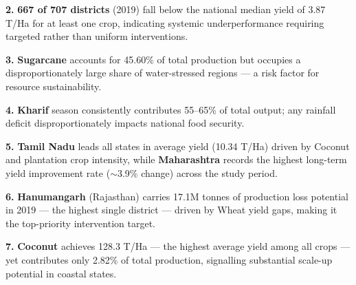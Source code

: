 \documentclass[10pt]{article}
\begin{document}
\vspace{3pt}

\begin{insightbox}
  \textbf{2.} \textbf{667 of 707 districts} (2019) fall below the national median yield
  of 3.87 T/Ha for at least one crop, indicating systemic underperformance requiring
  targeted rather than uniform interventions.
\end{insightbox}

\vspace{3pt}

\begin{insightbox}
  \textbf{3.} \textbf{Sugarcane} accounts for 45.60\% of total production but
  occupies a disproportionately large share of water-stressed regions — a risk
  factor for resource sustainability.
\end{insightbox}

\vspace{3pt}

\begin{insightbox}
  \textbf{4.} \textbf{Kharif} season consistently contributes 55–65\% of total
  output; any rainfall deficit disproportionately impacts national food security.
\end{insightbox}

\vspace{3pt}

\begin{insightbox}
  \textbf{5.} \textbf{Tamil Nadu} leads all states in average yield (10.34 T/Ha)
  driven by Coconut and plantation crop intensity, while \textbf{Maharashtra}
  records the highest long-term yield improvement rate ($\sim$3.9\% change)
  across the study period.
\end{insightbox}

\vspace{3pt}

\begin{insightbox}
  \textbf{6.} \textbf{Hanumangarh} (Rajasthan) carries 17.1M tonnes of production
  loss potential in 2019 — the highest single district — driven by Wheat yield
  gaps, making it the top-priority intervention target.
\end{insightbox}

\vspace{3pt}

\begin{insightbox}
  \textbf{7.} \textbf{Coconut} achieves 128.3 T/Ha — the highest average yield
  among all crops — yet contributes only 2.82\% of total production, signalling
  substantial scale-up potential in coastal states.
\end{insightbox}
\end{document}
